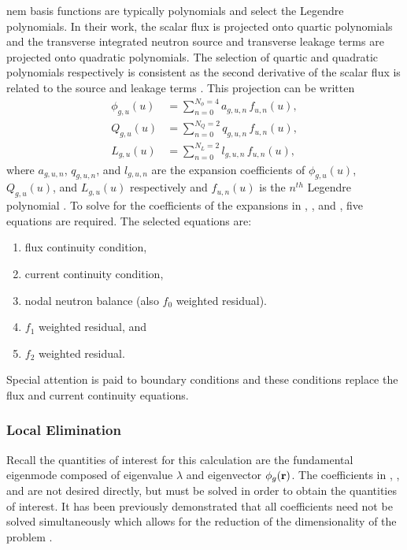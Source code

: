     \gls{nem} basis functions are typically polynomials and
    \citeauthor{qe2paper} select the Legendre polynomials. In their work, the
    scalar flux is projected onto quartic polynomials and the transverse
    integrated neutron source and transverse leakage terms are projected onto
    quadratic polynomials. The selection of quartic and quadratic polynomials
    respectively is consistent as the second derivative of the scalar flux is
    related to the source and leakage terms \cite{gehinThesis}. This projection
    can be written
    \begin{align}
      \label{eq:flux_expansion}
      \phi_{g,u}(u) &= \sum_{n=0}^{N_{\phi} = 4} a_{g,u,n} \, f_{u,n}(u), \\
      \label{eq:source_expansion}
      Q_{g,u}(u)    &= \sum_{n=0}^{N_Q = 2}      q_{g,u,n} \, f_{u,n}(u), \\
      \label{eq:leakage_expansion}
      L_{g,u}(u)    &= \sum_{n=0}^{N_L = 2}      l_{g,u,n} \, f_{u,n}(u),
    \end{align}
    where $a_{g,u,n}$, $q_{g,u,n}$, and $l_{g,u,n}$ are the expansion
    coefficients of $\phi_{g,u}(u)$, $Q_{g,u}(u)$, and $L_{g,u}(u)$ respectively
    and $f_{u,n}(u)$ is the $n^{th}$ Legendre polynomial \cite{qe2paper}. To
    solve for the coefficients of the expansions in ,
    , and , five equations
    are required. The selected equations are:
    \begin{enumerate}
      \item flux continuity condition,
      \item current continuity condition,
      \item nodal neutron balance (also $f_0$ weighted residual).
      \item $f_1$ weighted residual, and
      \item $f_2$ weighted residual.
    \end{enumerate}
    Special attention is paid to boundary conditions and these conditions 
    replace the flux and current continuity equations.

    \subsubsection{Local Elimination}
      \label{sec:local_elimination}

      Recall the quantities of interest for this calculation are the fundamental
      eigenmode composed of eigenvalue $\lambda$ and eigenvector $\phi_g(\mathbf{r})$.
      The coefficients in , ,
      and  are not desired directly, but must be
      solved in order to obtain the quantities of interest. It has been
      previously demonstrated that all coefficients need not be solved
      simultaneously which allows for the reduction of the dimensionality of the
      problem \cite{gehinThesis}.

